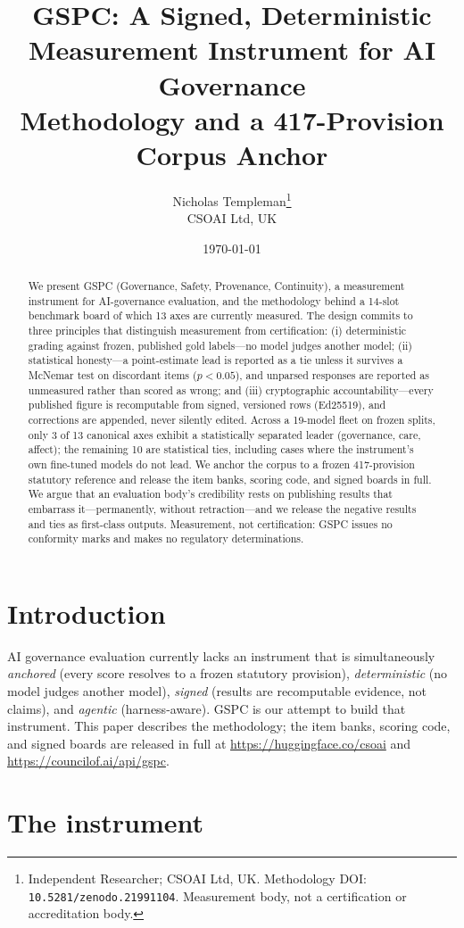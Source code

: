 \documentclass[11pt]{article}
\title{GSPC: A Signed, Deterministic Measurement Instrument for AI Governance\\
\large Methodology and a 417-Provision Corpus Anchor}
\author{Nicholas Templeman\thanks{Independent Researcher; CSOAI Ltd, UK. Methodology DOI: \texttt{10.5281/zenodo.21991104}. Measurement body, not a certification or accreditation body.}\\
\small CSOAI Ltd, UK}
\date{\today}
\begin{document}
\maketitle

\begin{abstract}
We present GSPC (Governance, Safety, Provenance, Continuity), a measurement
instrument for AI-governance evaluation, and the methodology behind a 14-slot
benchmark board of which 13 axes are currently measured. The design commits to
three principles that distinguish measurement from certification: (i)
deterministic grading against frozen, published gold labels---no model judges
another model; (ii) statistical honesty---a point-estimate lead is reported as
a tie unless it survives a McNemar test on discordant items ($p<0.05$), and
unparsed responses are reported as unmeasured rather than scored as wrong; and
(iii) cryptographic accountability---every published figure is recomputable
from signed, versioned rows (Ed25519), and corrections are appended, never
silently edited. Across a 19-model fleet on frozen splits, only 3 of 13
canonical axes exhibit a statistically separated leader (governance, care,
affect); the remaining 10 are statistical ties, including cases where the
instrument's own fine-tuned models do not lead. We anchor the corpus to a
frozen 417-provision statutory reference and release the item banks, scoring
code, and signed boards in full. We argue that an evaluation body's credibility
rests on publishing results that embarrass it---permanently, without
retraction---and we release the negative results and ties as first-class
outputs. Measurement, not certification: GSPC issues no conformity marks and
makes no regulatory determinations.
\end{abstract}

\section{Introduction}
AI governance evaluation currently lacks an instrument that is simultaneously
\emph{anchored} (every score resolves to a frozen statutory provision),
\emph{deterministic} (no model judges another model), \emph{signed} (results
are recomputable evidence, not claims), and \emph{agentic} (harness-aware).
GSPC is our attempt to build that instrument. This paper describes the
methodology; the item banks, scoring code, and signed boards are released in
full at \url{https://huggingface.co/csoai} and \url{https://councilof.ai/api/gspc}.

\section{The instrument}
\end{document}
